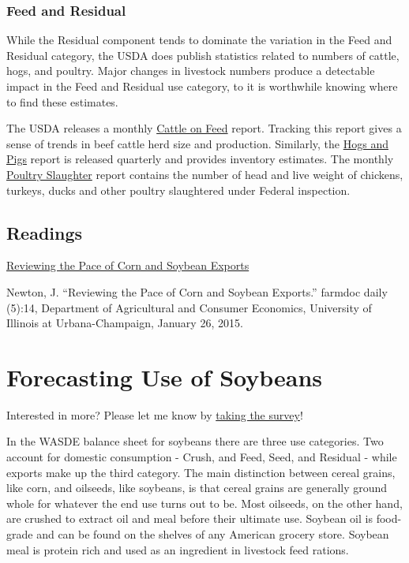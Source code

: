 \documentclass[
  letterpaper,
  DIV=11,
  numbers=noendperiod]{scrreprt}
\begin{document}
\subsection{Feed and Residual}\label{feed-and-residual-1}

While the Residual component tends to dominate the variation in the Feed
and Residual category, the USDA does publish statistics related to
numbers of cattle, hogs, and poultry. Major changes in livestock numbers
produce a detectable impact in the Feed and Residual use category, to it
is worthwhile knowing where to find these estimates.

The USDA releases a monthly
\href{http://usda.mannlib.cornell.edu/MannUsda/viewDocumentInfo.do?documentID=1020}{Cattle
on Feed} report. Tracking this report gives a sense of trends in beef
cattle herd size and production. Similarly, the
\href{http://usda.mannlib.cornell.edu/MannUsda/viewDocumentInfo.do?documentID=1086}{Hogs
and Pigs} report is released quarterly and provides inventory estimates.
The monthly
\href{https://usda.mannlib.cornell.edu/MannUsda/viewDocumentInfo.do?documentID=1131}{Poultry
Slaughter} report contains the number of head and live weight of
chickens, turkeys, ducks and other poultry slaughtered under Federal
inspection.

\section{Readings}\label{readings-3}

\href{http://farmdocdaily.illinois.edu/2015/01/reviewing-pace-of-corn-and-soybean-exports.html}{Reviewing
the Pace of Corn and Soybean Exports}

Newton, J. ``Reviewing the Pace of Corn and Soybean Exports.'' farmdoc
daily (5):14, Department of Agricultural and Consumer Economics,
University of Illinois at Urbana-Champaign, January 26, 2015.


\chapter{Forecasting Use of Soybeans}\label{forecasting-use-of-soybeans}

{Interested in more? Please let me know by}
\href{https://forms.gle/Q3VByCQZHjfQSy9D7}{taking the survey}!

In the WASDE balance sheet for soybeans there are three use categories.
Two account for domestic consumption - Crush, and Feed, Seed, and
Residual - while exports make up the third category. The main
distinction between cereal grains, like corn, and oilseeds, like
soybeans, is that cereal grains are generally ground whole for whatever
the end use turns out to be. Most oilseeds, on the other hand, are
crushed to extract oil and meal before their ultimate use. Soybean oil
is food-grade and can be found on the shelves of any American grocery
store. Soybean meal is protein rich and used as an ingredient in
livestock feed rations.
\end{document}
